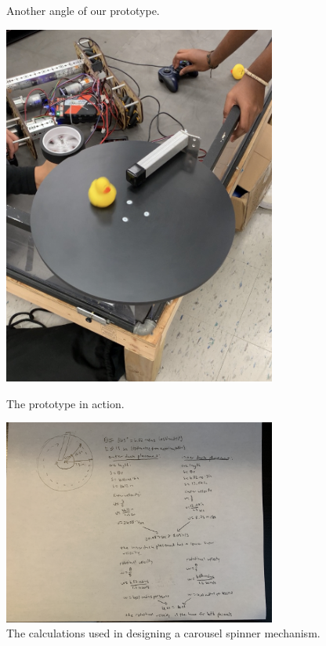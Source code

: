 \begin{figure}[ht]
\begin{minipage}[b]{.50\textwidth}
  \caption{Another angle of our prototype.}
  \label{fig:pic2}
\end{minipage}
\end{figure}

\begin{figure}[ht]
\centering
\begin{minipage}[b]{.50\textwidth}
  \centering
  \includegraphics[width=0.8\textwidth]{Meetings/September/09-28-21/9-28-21_Hardware_Image3 - Nathan Forrer.jpg}
  \caption{The prototype in action.}
  \label{fig:pic3}
\end{minipage}%
\hfill%
\begin{minipage}[b]{.50\textwidth}
  \centering
  \includegraphics[width=0.8\textwidth]{Meetings/September/09-28-21/9-28-21_Hardware_Image4 - Nathan Forrer.jpg}
  \caption{The calculations used in designing a carousel spinner mechanism.}
  \label{fig:pic4}
\end{minipage}
\end{figure}

